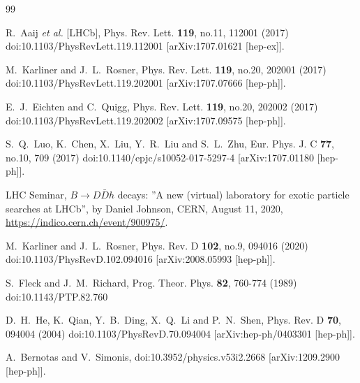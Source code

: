 \documentclass[prd,twocolumn,floatfix,nofootinbib]{revtex4}
\begin{document}
\begin{thebibliography}{99}

    R.~Aaij \textit{et al.} [LHCb],
    Phys. Rev. Lett. \textbf{119}, no.11, 112001 (2017)
    doi:10.1103/PhysRevLett.119.112001
    [arXiv:1707.01621 [hep-ex]].

    M.~Karliner and J.~L.~Rosner,
    Phys. Rev. Lett. \textbf{119}, no.20, 202001 (2017)
    doi:10.1103/PhysRevLett.119.202001
    [arXiv:1707.07666 [hep-ph]].

    E.~J.~Eichten and C.~Quigg,
    Phys. Rev. Lett. \textbf{119}, no.20, 202002 (2017)
    doi:10.1103/PhysRevLett.119.202002
    [arXiv:1707.09575 [hep-ph]].

    S.~Q.~Luo, K.~Chen, X.~Liu, Y.~R.~Liu and S.~L.~Zhu,
    Eur. Phys. J. C \textbf{77}, no.10, 709 (2017)
    doi:10.1140/epjc/s10052-017-5297-4
    [arXiv:1707.01180 [hep-ph]].

 LHC Seminar,
    $B\to D\bar{D}h$ decays: ''A new (virtual) laboratory for exotic particle searches at LHCb'',
    by Daniel Johnson, CERN, August 11, 2020,
    \href{https://indico.cern.ch/event/900975/}{https://indico.cern.ch/event/900975/}.

    M.~Karliner and J.~L.~Rosner,
    Phys. Rev. D \textbf{102}, no.9, 094016 (2020)
    doi:10.1103/PhysRevD.102.094016
    [arXiv:2008.05993 [hep-ph]].

    S.~Fleck and J.~M.~Richard,
    Prog. Theor. Phys. \textbf{82}, 760-774 (1989)
    doi:10.1143/PTP.82.760

    D.~H.~He, K.~Qian, Y.~B.~Ding, X.~Q.~Li and P.~N.~Shen,
    Phys. Rev. D \textbf{70}, 094004 (2004)
    doi:10.1103/PhysRevD.70.094004
    [arXiv:hep-ph/0403301 [hep-ph]].

    A.~Bernotas and V.~Simonis,
    doi:10.3952/physics.v53i2.2668
    [arXiv:1209.2900 [hep-ph]].


\end{thebibliography}
\end{document}
